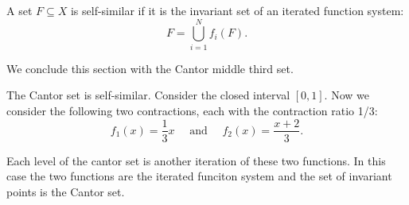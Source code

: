\begin{definition}
    A set $F\subseteq X$ is self-similar if it is the invariant set of an iterated function system:
    $$F = \bigcup_{i=1}^N f_i(F).$$
\end{definition}
We conclude this section with the Cantor middle third set.  
\begin{example}
    The Cantor set is self-similar.  Consider the closed interval $[0,1]$.  Now we consider the following two contractions, each with the contraction ratio 1/3: 
    $$f_1 (x) = \frac{1}{3}x \quad \text{ and } \quad f_2 (x) = \frac{x+2}{3}.$$

    Each level of the cantor set is another iteration of these two functions.  In this case the two functions are the iterated funciton system and the set of invariant points is the Cantor set.  
\end{example}